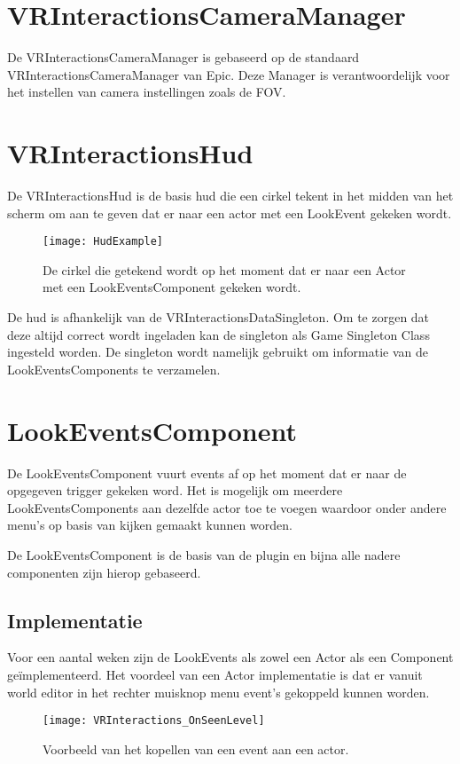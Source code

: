 \section{VRInteractionsCameraManager}
De VRInteractionsCameraManager is gebaseerd op de standaard VRInteractionsCameraManager van Epic. Deze Manager is verantwoordelijk voor het instellen van camera instellingen zoals de FOV. 

\section{VRInteractionsHud}
De VRInteractionsHud is de basis \gls{hud} die een cirkel tekent in het midden van het scherm om aan te geven dat er naar een actor met een LookEvent gekeken wordt.

\begin{figure}[H]
  \centering
    \texttt{[image: HudExample]}
    \caption{De cirkel die getekend wordt op het moment dat er naar een Actor met een LookEventsComponent gekeken wordt.}
\end{figure}

De \gls{hud} is afhankelijk van de VRInteractionsDataSingleton. Om te zorgen dat deze altijd correct wordt ingeladen kan de singleton als Game Singleton Class ingesteld worden. De singleton wordt namelijk gebruikt om informatie van de LookEventsComponents te verzamelen.

\section{LookEventsComponent}
De LookEventsComponent vuurt events af op het moment dat er naar de opgegeven trigger gekeken word. Het is mogelijk om meerdere LookEventsComponents aan dezelfde actor toe te voegen waardoor onder andere menu's op basis van kijken gemaakt kunnen worden.

De LookEventsComponent is de basis van de plugin en bijna alle nadere componenten zijn hierop gebaseerd. 

\subsection{Implementatie}
Voor een aantal weken zijn de LookEvents als zowel een Actor als een Component geïmplementeerd. Het voordeel van een Actor implementatie is dat er vanuit world editor in het rechter muisknop menu event's gekoppeld kunnen worden.

\begin{figure}[!ht]
  \centering
    \texttt{[image: VRInteractions\_OnSeenLevel]}
    \caption{Voorbeeld van het kopellen van een event aan een actor.}
\end{figure}

